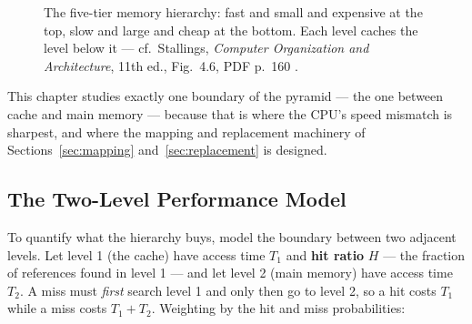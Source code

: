 \documentclass[11pt]{article}
\begin{document}
\begin{figure}[h]
  \centering
  \caption{The five-tier memory hierarchy: fast and small and expensive at the top, slow and large and cheap at the bottom. Each level caches the level below it --- cf.\ Stallings, \textit{Computer Organization and Architecture}, 11th ed., Fig.~4.6, PDF p.~160 \cite{Stallings2015_computer_organization}.}
  \label{fig:hierarchy}
\end{figure}

This chapter studies exactly one boundary of the pyramid --- the one between cache and main memory --- because that is where the CPU's speed mismatch is sharpest, and where the mapping and replacement machinery of Sections~\ref{sec:mapping} and~\ref{sec:replacement} is designed.

\subsection{The Two-Level Performance Model}

To quantify what the hierarchy buys, model the boundary between two adjacent levels. Let level 1 (the cache) have access time $T_1$ and \textbf{hit ratio} $H$ --- the fraction of references found in level 1 --- and let level 2 (main memory) have access time $T_2$. A miss must \emph{first} search level 1 and only then go to level 2, so a hit costs $T_1$ while a miss costs $T_1 + T_2$. Weighting by the hit and miss probabilities:
\end{document}
